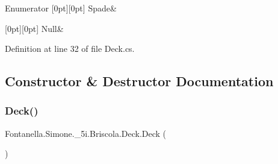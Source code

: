 \begin{DoxyEnumFields}{Enumerator}
[0pt][0pt]{}\hypertarget{class_fontanella_1_1_simone_1_1__5i_1_1_briscola_1_1_deck_a7f82994e5bc71f3c6ab33157e02554eaad3823d5046826424cb0b4f16a4daabcc}{}\label{class_fontanella_1_1_simone_1_1__5i_1_1_briscola_1_1_deck_a7f82994e5bc71f3c6ab33157e02554eaad3823d5046826424cb0b4f16a4daabcc} 
Spade&\\
\hline

[0pt][0pt]{}\hypertarget{class_fontanella_1_1_simone_1_1__5i_1_1_briscola_1_1_deck_a7f82994e5bc71f3c6ab33157e02554eaabbb93ef26e3c101ff11cdd21cab08a94}{}\label{class_fontanella_1_1_simone_1_1__5i_1_1_briscola_1_1_deck_a7f82994e5bc71f3c6ab33157e02554eaabbb93ef26e3c101ff11cdd21cab08a94} 
Null&\\
\hline

\end{DoxyEnumFields}


Definition at line 32 of file Deck.\+cs.



\subsection{Constructor \& Destructor Documentation}
\hypertarget{class_fontanella_1_1_simone_1_1__5i_1_1_briscola_1_1_deck_a4f65193e53a0190f38af395d126709d4}{}\label{class_fontanella_1_1_simone_1_1__5i_1_1_briscola_1_1_deck_a4f65193e53a0190f38af395d126709d4} 
\subsubsection{\texorpdfstring{Deck()}{Deck()}}
{\footnotesize\ttfamily Fontanella.\+Simone.\+\_\+5i.\+Briscola.\+Deck.\+Deck (\begin{DoxyParamCaption}{ }\end{DoxyParamCaption})}



